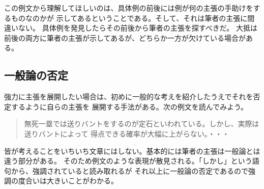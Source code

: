 \documentclass{tarticle}
\begin{document}
	この例文から理解してほしいのは、具体例の前後には例が何の主張の手助けをするものなのかが
	示してあるということである。そして、それは筆者の主張に間違いない。
	具体例を発見したらその前後から筆者の主張を探すべきだ。
    大抵は前後の両方に筆者の主張が示してあるが、どちらか一方が欠けている場合がある。


	\subsection{一般論の否定}
	強力に主張を展開したい場合は、初めに一般的な考えを紹介したうえでそれを否定するように自らの主張を
	展開する手法がある。次の例文を読んでみよう。

	\begin{quotation}
		無死一塁では送りバントをするのが定石といわれている。しかし、実際は送りバントによって
		得点できる確率が大幅に上がらない。・・・
	\end{quotation}

	皆が考えることをいちいち文章にはしない。基本的には筆者の主張は一般論とは違う部分がある。
	そのため例文のような表現が散見される。「しかし」という語句から、強調されていると読み取れるが
	それ以上に一般論の否定であるので強調の度合いは大きいことがわかる。
\end{document}
